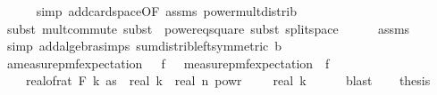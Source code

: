 \begin{isabellebody}
\ \ \ \ \isamarkupfalse%
\ {\isacharparenleft}{\kern0pt}simp\ add{\isacharcolon}{\kern0pt}card{\isacharunderscore}{\kern0pt}space{\isacharbrackleft}{\kern0pt}OF\ assms{\isacharparenleft}{\kern0pt}{}{\isacharparenright}{\kern0pt}{\isacharbrackright}{\kern0pt}\ power{\isacharunderscore}{\kern0pt}mult{\isacharunderscore}{\kern0pt}distrib{\isacharparenright}{\kern0pt}\isanewline
\ \ \ \ \isamarkupfalse%
\ {\isacharparenleft}{\kern0pt}subst\ mult{\isachardot}{\kern0pt}commute{\isacharcomma}{\kern0pt}\ subst\ {\isacharparenleft}{\kern0pt}{}{\isacharparenright}{\kern0pt}\ power{}{\isacharunderscore}{\kern0pt}eq{\isacharunderscore}{\kern0pt}square{\isacharcomma}{\kern0pt}\ subst\ split{\isacharunderscore}{\kern0pt}space{\isacharparenright}{\kern0pt}\isanewline
\ \ \ \ \isamarkupfalse%
\ assms{\isacharparenleft}{\kern0pt}{}{\isacharparenright}{\kern0pt}\ \isamarkupfalse%
\ {\isacharparenleft}{\kern0pt}simp\ add{\isacharcolon}{\kern0pt}algebra{\isacharunderscore}{\kern0pt}simps\ sum{\isacharunderscore}{\kern0pt}distrib{\isacharunderscore}{\kern0pt}left{\isacharbrackleft}{\kern0pt}symmetric{\isacharbrackright}{\kern0pt}\ b{\isacharparenright}{\kern0pt}\isanewline
\ \ \isamarkupfalse%
\ \isamarkupfalse%
\ a{\isacharcolon}{\kern0pt}{\isachardoublequoteopen}measure{\isacharunderscore}{\kern0pt}pmf{\isachardot}{\kern0pt}expectation\ {\isasymOmega}\ {\isacharparenleft}{\kern0pt}{\isasymlambda}{\isasymomega}{\isachardot}{\kern0pt}\ f\ {\isasymomega}{\isacharcircum}{\kern0pt}{}{\isacharparenright}{\kern0pt}\ {\isacharminus}{\kern0pt}\ {\isacharparenleft}{\kern0pt}measure{\isacharunderscore}{\kern0pt}pmf{\isachardot}{\kern0pt}expectation\ {\isasymOmega}\ f{\isacharparenright}{\kern0pt}{\isacharcircum}{\kern0pt}{}\ {\isasymle}\ \isanewline
\ \ \ \ {\isacharparenleft}{\kern0pt}real{\isacharunderscore}{\kern0pt}of{\isacharunderscore}{\kern0pt}rat\ {\isacharparenleft}{\kern0pt}F\ k\ as{\isacharparenright}{\kern0pt}{\isacharparenright}{\kern0pt}\ {\isacharasterisk}{\kern0pt}\ real\ k\ {\isacharasterisk}{\kern0pt}\ real\ n\ powr\ {\isacharparenleft}{\kern0pt}{}\ {\isacharminus}{\kern0pt}\ {}\ {\isacharslash}{\kern0pt}\ real\ k{\isacharparenright}{\kern0pt}{\isachardoublequoteclose}\isanewline
\ \ \ \ \isamarkupfalse%
\ blast\isanewline
\isanewline
\ \ \isamarkupfalse%
\ {\isacharquery}{\kern0pt}thesis\isanewline
\ \ \ \ \isamarkupfalse%

\end{isabellebody}
